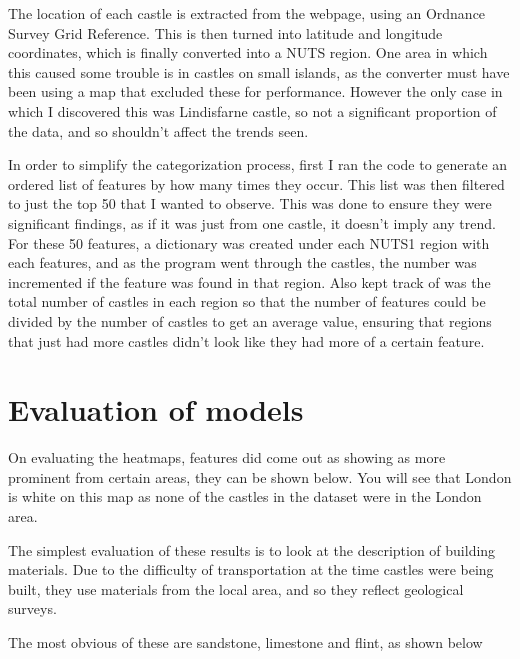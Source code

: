 \documentclass[11pt]{article}
\begin{document}
The location of each castle is extracted from the webpage, using an Ordnance Survey Grid Reference. This is then turned into latitude and longitude coordinates, which is finally converted into a NUTS region. One area in which this caused some trouble is in castles on small islands, as the converter must have been using a map that excluded these for performance. However the only case in which I discovered this was Lindisfarne castle, so not a significant proportion of the data, and so shouldn't affect the trends seen.

In order to simplify the categorization process, first I ran the code to generate an ordered list of features by how many times they occur. This list was then filtered to just the top 50 that I wanted to observe. This was done to ensure they were significant findings, as if it was just from one castle, it doesn't imply any trend. For these 50 features, a dictionary was created under each NUTS1 region with each features, and as the program went through the castles, the number was incremented if the feature was found in that region. Also kept track of was the total number of castles in each region so that the number of features could be divided by the number of castles to get an average value, ensuring that regions that just had more castles didn't look like they had more of a certain feature.


\section{Evaluation of models}

On evaluating the heatmaps, features did come out as showing as more prominent from certain areas, they can be shown below. You will see that London is white on this map as none of the castles in the dataset were in the London area.

The simplest evaluation of these results is to look at the description of building materials. Due to the difficulty of transportation at the time castles were being built, they use materials from the local area, and so they reflect geological surveys.

The most obvious of these are sandstone, limestone and flint, as shown below
\end{document}
